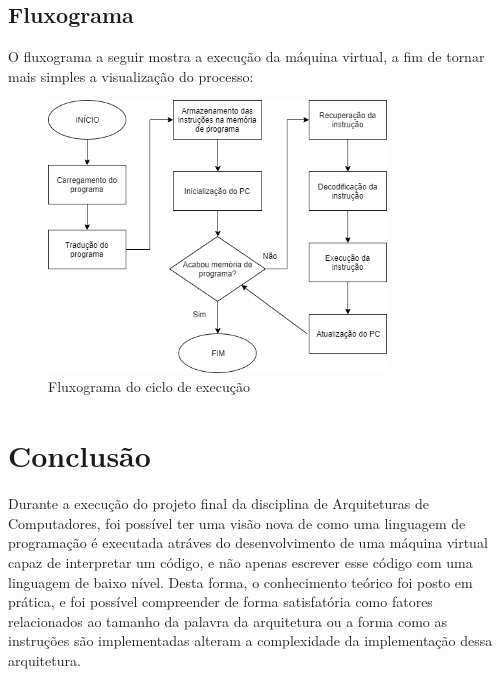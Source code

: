 \documentclass[
	12pt,				%
	oneside,			%
	a4paper,			%
	english,			%
	french,				%
	spanish,			%
	brazil				%
	]{abntex2}
\begin{document}
\section{Fluxograma}

O fluxograma a seguir mostra a execução da máquina virtual, a fim de tornar mais simples a visualização do processo:\\

\begin{figure}[h]
\begin{center}
\includegraphics[width=0.8\textwidth]{FluxAmpa}
\end{center}
\caption{Fluxograma do ciclo de execução}
\end{figure}


\chapter*[Conclusão]{Conclusão}

Durante a execução do projeto final da disciplina de Arquiteturas de Computadores, foi possível ter uma visão nova de como uma linguagem de programação é executada atráves do desenvolvimento de uma máquina virtual capaz de interpretar um código, e não apenas escrever esse código com uma linguagem de baixo nível. Desta forma, o conhecimento teórico foi posto em prática, e foi possível compreender de forma satisfatória como fatores relacionados ao tamanho da palavra da arquitetura ou a forma como as instruções são implementadas alteram a complexidade da implementação dessa arquitetura.
\end{document}
